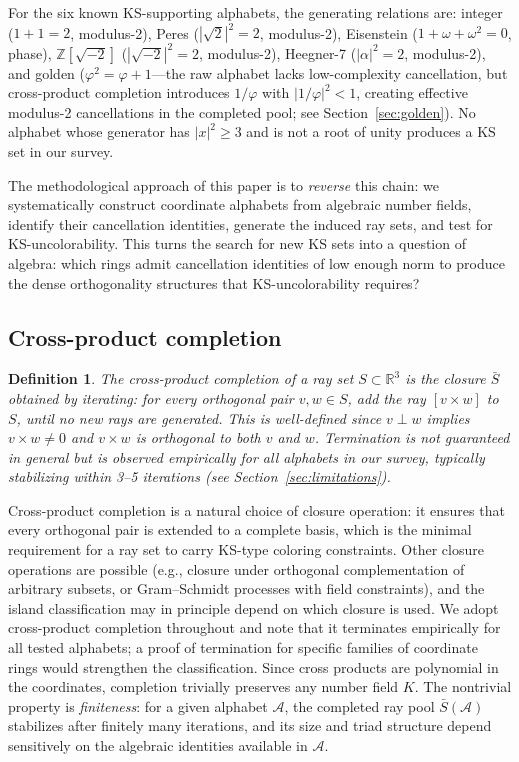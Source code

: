 \documentclass[12pt,a4paper]{article}
\newtheorem{definition}[theorem]{Definition}
\newcommand{\R}{\mathbb{R}}
\newcommand{\Z}{\mathbb{Z}}
\begin{document}
For the six known KS-supporting alphabets, the generating relations are: integer ($1+1=2$, modulus-2), Peres ($|\sqrt{2}|^2=2$, modulus-2), Eisenstein ($1+\omega+\omega^2=0$, phase), $\Z[\sqrt{-2}]$ ($|\sqrt{-2}|^2=2$, modulus-2), Heegner-7 ($|\alpha|^2=2$, modulus-2), and golden ($\varphi^2=\varphi+1$---the raw alphabet lacks low-complexity cancellation, but cross-product completion introduces $1/\varphi$ with $|1/\varphi|^2 < 1$, creating effective modulus-2 cancellations in the completed pool; see Section~\ref{sec:golden}).  No alphabet whose generator has $|x|^2 \geq 3$ and is not a root of unity produces a KS set in our survey.

The methodological approach of this paper is to \emph{reverse} this chain: we systematically construct coordinate alphabets from algebraic number fields, identify their cancellation identities, generate the induced ray sets, and test for KS-uncolorability.  This turns the search for new KS sets into a question of algebra: which rings admit cancellation identities of low enough norm to produce the dense orthogonality structures that KS-uncolorability requires?

\subsection{Cross-product completion}

\begin{definition}\label{def:completion}
The \emph{cross-product completion} of a ray set $S \subset \R^3$ is the closure $\bar{S}$ obtained by iterating: for every orthogonal pair $v, w \in S$, add the ray $[v \times w]$ to $S$, until no new rays are generated. This is well-defined since $v \perp w$ implies $v \times w \neq 0$ and $v \times w$ is orthogonal to both $v$ and $w$. Termination is not guaranteed in general but is observed empirically for all alphabets in our survey, typically stabilizing within 3--5 iterations (see Section~\ref{sec:limitations}).
\end{definition}

Cross-product completion is a natural choice of closure operation: it ensures that every orthogonal pair is extended to a complete basis, which is the minimal requirement for a ray set to carry KS-type coloring constraints.  Other closure operations are possible (e.g., closure under orthogonal complementation of arbitrary subsets, or Gram--Schmidt processes with field constraints), and the island classification may in principle depend on which closure is used.  We adopt cross-product completion throughout and note that it terminates empirically for all tested alphabets; a proof of termination for specific families of coordinate rings would strengthen the classification.  Since cross products are polynomial in the coordinates, completion trivially preserves any number field $K$. The nontrivial property is \emph{finiteness}: for a given alphabet $\mathcal{A}$, the completed ray pool $\bar{S}(\mathcal{A})$ stabilizes after finitely many iterations, and its size and triad structure depend sensitively on the algebraic identities available in $\mathcal{A}$.
\end{document}
